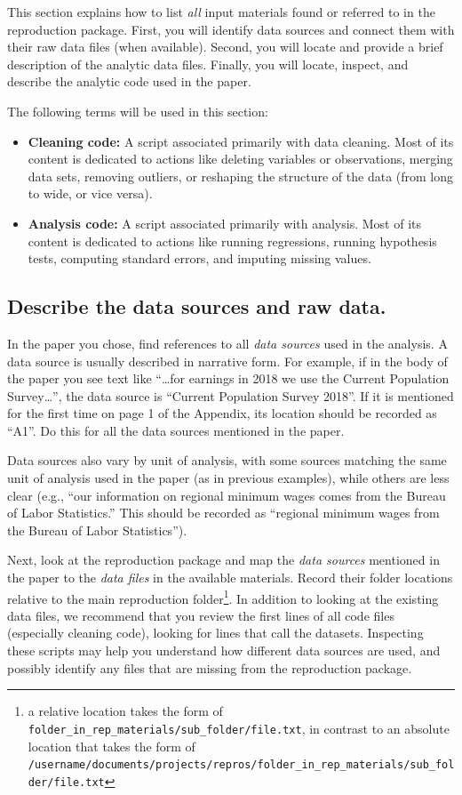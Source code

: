 \documentclass[]{book}
\begin{document}
This section explains how to list \emph{all} input materials found or referred to in the reproduction package. First, you will identify data sources and connect them with their raw data files (when available). Second, you will locate and provide a brief description of the analytic data files. Finally, you will locate, inspect, and describe the analytic code used in the paper.

The following terms will be used in this section:

\begin{itemize}
\item
  \textbf{Cleaning code:} A script associated primarily with data cleaning. Most of its content is dedicated to actions like deleting variables or observations, merging data sets, removing outliers, or reshaping the structure of the data (from long to wide, or vice versa).
\item
  \textbf{Analysis code:} A script associated primarily with analysis. Most of its content is dedicated to actions like running regressions, running hypothesis tests, computing standard errors, and imputing missing values.
\end{itemize}

\hypertarget{desc-sourc}{%
\subsection{Describe the data sources and raw data.}\label{desc-sourc}}

In the paper you chose, find references to all \emph{data sources} used in the analysis. A data source is usually described in narrative form. For example, if in the body of the paper you see text like ``\ldots{}for earnings in 2018 we use the Current Population Survey\ldots{}'', the data source is ``Current Population Survey 2018''. If it is mentioned for the first time on page 1 of the Appendix, its location should be recorded as ``A1''. Do this for all the data sources mentioned in the paper.

Data sources also vary by unit of analysis, with some sources matching the same unit of analysis used in the paper (as in previous examples), while others are less clear (e.g., ``our information on regional minimum wages comes from the Bureau of Labor Statistics.'' This should be recorded as ``regional minimum wages from the Bureau of Labor Statistics'').

Next, look at the reproduction package and map the \emph{data sources} mentioned in the paper to the \emph{data files} in the available materials. Record their folder locations relative to the main reproduction folder\footnote{a relative location takes the form of \texttt{folder\_in\_rep\_materials/sub\_folder/file.txt}, in contrast to an absolute location that takes the form of \texttt{/username/documents/projects/repros/folder\_in\_rep\_materials/sub\_folder/file.txt}}. In addition to looking at the existing data files, we recommend that you review the first lines of all code files (especially cleaning code), looking for lines that call the datasets. Inspecting these scripts may help you understand how different data sources are used, and possibly identify any files that are missing from the reproduction package.
\end{document}
